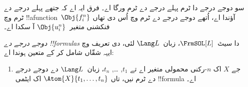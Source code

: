 \documentclass[../../../include/open-logic-section]{subfiles}
\begin{document}
\begin{explain}
سو دوجے درجے دا ٹرم پہلے درجے دے ٹرم ورگا اے۔
فرق ایہ اے کہ جتھے پہلے درجے دے ٹرم
وچ !!a{function}~$\Obj{f^n_i}$ آؤندا اے، اُتھے
دوجے درجے دے ٹرم وچ اُس دی تھاں فنکشنی
متغیر~$\Obj{u^n_i}$ آ سکدا اے۔
\end{explain}

\begin{defn}
\emph{دوجے درجے دے !!{formula}s} دا سیٹ~$\FrmSOL[L]$،
زبان~$\Lang L$ لئی،
 دی تعریف وچ
ایہہ شقّاں شامل کر کے متعین ہوندا اے:
\begin{enumerate}
\item جے $X$ اک $n$-رکنی محمولی متغیر اے تے $t_1$, \dots,
  $t_n$، زبان~$\Lang L$ دے دوجے درجے دے ٹرم نیں، تاں
  $\Atom{X}{t_1,\ldots, t_n}$ اک ایٹمی !!{formula} اے۔




\end{enumerate}
\end{defn}
\end{document}

